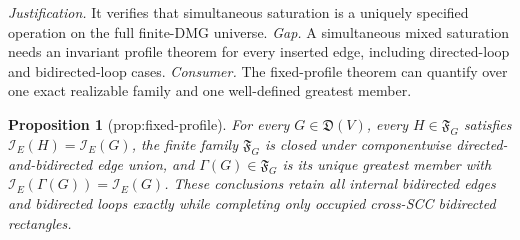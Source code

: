\documentclass{article}
\newtheorem{proposition}{Proposition}
\begin{document}
\par\smallskip\noindent \textit{Justification.} It verifies that simultaneous saturation is a uniquely specified operation on the full finite-DMG universe. \textit{Gap.} A simultaneous mixed saturation needs an invariant profile theorem for every inserted edge, including directed-loop and bidirected-loop cases. \textit{Consumer.} The fixed-profile theorem can quantify over one exact realizable family and one well-defined greatest member.

\begin{proposition}[prop:fixed-profile]\label{prop:fixed-profile}
For every \(G\in\mathfrak D(V)\), every \(H\in\mathfrak F_G\) satisfies \(\mathcal I_E(H)=\mathcal I_E(G)\), the finite family \(\mathfrak F_G\) is closed under componentwise directed-and-bidirected edge union, and \(\Gamma(G)\in\mathfrak F_G\) is its unique greatest member with \(\mathcal I_E(\Gamma(G))=\mathcal I_E(G)\). These conclusions retain all internal bidirected edges and bidirected loops exactly while completing only occupied cross-SCC bidirected rectangles.
\end{proposition}
\end{document}
